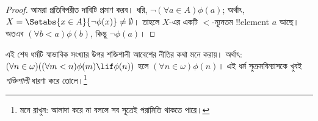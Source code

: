 \documentclass[../../../include/open-logic-section]{subfiles}
\begin{document}
\begin{proof}
আমরা প্রতিবিপরীত দাবিটি প্রমাণ করব। ধরি,
$\lnot(\forall a \in A)\phi(a)$; অর্থাৎ,
$X = \Setabs{x \in A}{\lnot\phi(x)} \neq \emptyset$।
তাহলে $X$-এর একটি $<$-ন্যূনতম !!{element} $a$ আছে।
অতএব $(\forall b < a)\phi(b)$, কিন্তু $\lnot \phi(a)$।
\end{proof}\noindent এই শেষ ধর্মটি স্বাভাবিক সংখ্যার উপর
শক্তিশালী আবেশের নীতির কথা মনে করায়। অর্থাৎ:
$(\forall n \in \omega)((\forall m < n)\phi(m)
\lif \phi(n))$ হলে $(\forall n \in \omega)\phi(n)$।
এই ধর্ম সুক্রমবিন্যাসকে খুবই \emph{শক্তিশালী}
ধারণা করে তোলে।\footnote{মনে রাখুন: আলাদা করে না
বললে সব সূত্রেই পরামিতি থাকতে পারে।}
\end{document}
